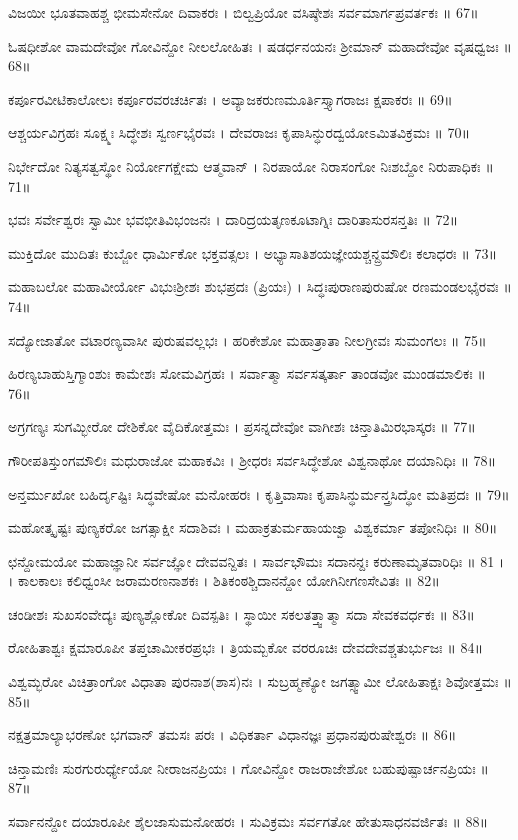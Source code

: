 ವಿಜಯೀ ಭೂತವಾಹಶ್ಚ ಭೀಮಸೇನೋ ದಿವಾಕರಃ ।
ಬಿಲ್ವಪ್ರಿಯೋ ವಸಿಷ್ಠೇಶಃ ಸರ್ವಮಾರ್ಗಪ್ರವರ್ತಕಃ ॥ 67॥

ಓಷಧೀಶೋ ವಾಮದೇವೋ ಗೋವಿನ್ದೋ ನೀಲಲೋಹಿತಃ ।
ಷಡರ್ಧನಯನಃ ಶ್ರೀಮಾನ್ ಮಹಾದೇವೋ ವೃಷಧ್ವಜಃ ॥ 68॥

ಕರ್ಪೂರವೀಟಿಕಾಲೋಲಃ ಕರ್ಪೂರವರಚರ್ಚಿತಃ ।
ಅವ್ಯಾಜಕರುಣಮೂರ್ತಿಸ್ತ್ಯಾಗರಾಜಃ ಕ್ಷಪಾಕರಃ ॥ 69॥

ಆಶ್ಚರ್ಯವಿಗ್ರಹಃ ಸೂಕ್ಷ್ಮಃ ಸಿದ್ಧೇಶಃ ಸ್ವರ್ಣಭೈರವಃ ।
ದೇವರಾಜಃ ಕೃಪಾಸಿನ್ಧುರದ್ವಯೋಽಮಿತವಿಕ್ರಮಃ ॥ 70॥

ನಿರ್ಭೇದೋ ನಿತ್ಯಸತ್ವಸ್ಥೋ ನಿರ್ಯೋಗಕ್ಷೇಮ ಆತ್ಮವಾನ್ ।
ನಿರಪಾಯೋ ನಿರಾಸಂಗೋ ನಿಃಶಬ್ದೋ ನಿರುಪಾಧಿಕಃ ॥ 71॥

ಭವಃ ಸರ್ವೇಶ್ವರಃ ಸ್ವಾಮೀ ಭವಭೀತಿವಿಭಂಜನಃ ।
ದಾರಿದ್ರಯತೃಣಕೂಟಾಗ್ನಿಃ ದಾರಿತಾಸುರಸನ್ತತಿಃ ॥ 72॥

ಮುಕ್ತಿದೋ ಮುದಿತಃ ಕುಬ್ಜೋ ಧಾರ್ಮಿಕೋ ಭಕ್ತವತ್ಸಲಃ ।
ಅಭ್ಯಾಸಾತಿಶಯಜ್ಞೇಯಶ್ಚನ್ದ್ರಮೌಲಿಃ ಕಲಾಧರಃ ॥ 73॥

ಮಹಾಬಲೋ ಮಹಾವೀರ್ಯೋ ವಿಭುಃಶ್ರೀಶಃ ಶುಭಪ್ರದಃ (ಪ್ರಿಯಃ) ।
ಸಿದ್ಧಃಪುರಾಣಪುರುಷೋ ರಣಮಂಡಲಭೈರವಃ ॥ 74॥

ಸದ್ಯೋಜಾತೋ ವಟಾರಣ್ಯವಾಸೀ ಪುರುಷವಲ್ಲಭಃ ।
ಹರಿಕೇಶೋ ಮಹಾತ್ರಾತಾ ನೀಲಗ್ರೀವಃ ಸುಮಂಗಲಃ ॥ 75॥

ಹಿರಣ್ಯಬಾಹುಸ್ತಿಗ್ಮಾಂಶುಃ ಕಾಮೇಶಃ ಸೋಮವಿಗ್ರಹಃ ।
ಸರ್ವಾತ್ಮಾ ಸರ್ವಸತ್ಕರ್ತಾ ತಾಂಡವೋ ಮುಂಡಮಾಲಿಕಃ ॥ 76॥

ಅಗ್ರಗಣ್ಯಃ ಸುಗಮ್ಭೀರೋ ದೇಶಿಕೋ ವೈದಿಕೋತ್ತಮಃ ।
ಪ್ರಸನ್ನದೇವೋ ವಾಗೀಶಃ ಚಿನ್ತಾತಿಮಿರಭಾಸ್ಕರಃ ॥ 77॥

ಗೌರೀಪತಿಸ್ತುಂಗಮೌಲಿಃ ಮಧುರಾಜೋ ಮಹಾಕವಿಃ ।
ಶ್ರೀಧರಃ ಸರ್ವಸಿದ್ಧೇಶೋ ವಿಶ್ವನಾಥೋ ದಯಾನಿಧಿಃ ॥ 78॥

ಅನ್ತರ್ಮುಖೋ ಬಹಿರ್ದೃಷ್ಟಿಃ ಸಿದ್ಧವೇಷೋ ಮನೋಹರಃ ।
ಕೃತ್ತಿವಾಸಾಃ ಕೃಪಾಸಿನ್ಧುರ್ಮನ್ತ್ರಸಿದ್ಧೋ ಮತಿಪ್ರದಃ ॥ 79॥

ಮಹೋತ್ಕೃಷ್ಟಃ ಪುಣ್ಯಕರೋ ಜಗತ್ಸಾಕ್ಷೀ ಸದಾಶಿವಃ ।
ಮಹಾಕ್ರತುರ್ಮಹಾಯಜ್ವಾ ವಿಶ್ವಕರ್ಮಾ ತಪೋನಿಧಿಃ ॥ 80॥

ಛನ್ದೋಮಯೋ ಮಹಾಜ್ಞಾನೀ ಸರ್ವಜ್ಞೋ ದೇವವನ್ದಿತಃ ।
ಸಾರ್ವಭೌಮಃ ಸದಾನನ್ದಃ ಕರುಣಾಮೃತವಾರಿಧಿಃ ॥ 81 । ।
ಕಾಲಕಾಲಃ ಕಲಿಧ್ವಂಸೀ ಜರಾಮರಣನಾಶಕಃ ।
ಶಿತಿಕಂಠಶ್ಚಿದಾನನ್ದೋ ಯೋಗಿನೀಗಣಸೇವಿತಃ ॥ 82॥

ಚಂಡೀಶಃ ಸುಖಸಂವೇದ್ಯಃ ಪುಣ್ಯಶ್ಲೋಕೋ ದಿವಸ್ಪತಿಃ ।
ಸ್ಥಾಯೀ ಸಕಲತತ್ತ್ವಾತ್ಮಾ ಸದಾ ಸೇವಕವರ್ಧಕಃ ॥ 83॥

ರೋಹಿತಾಶ್ವಃ ಕ್ಷಮಾರೂಪೀ ತಪ್ತಚಾಮೀಕರಪ್ರಭಃ ।
ತ್ರಿಯಮ್ಬಕೋ ವರರೂಚಿಃ ದೇವದೇವಶ್ಚತುರ್ಭುಜಃ ॥ 84॥

ವಿಶ್ವಮ್ಭರೋ ವಿಚಿತ್ರಾಂಗೋ ವಿಧಾತಾ ಪುರನಾಶ(ಶಾಸ)ನಃ ।
ಸುಬ್ರಹ್ಮಣ್ಯೋ ಜಗತ್ಸ್ವಾಮೀ ಲೋಹಿತಾಕ್ಷಃ ಶಿವೋತ್ತಮಃ ॥ 85॥

ನಕ್ಷತ್ರಮಾಲ್ಯಾಭರಣೋ ಭಗವಾನ್ ತಮಸಃ ಪರಃ ।
ವಿಧಿಕರ್ತಾ ವಿಧಾನಜ್ಞಃ ಪ್ರಧಾನಪುರುಷೇಶ್ವರಃ ॥ 86॥

ಚಿನ್ತಾಮಣಿಃ ಸುರಗುರುರ್ಧ್ಯೇಯೋ ನೀರಾಜನಪ್ರಿಯಃ ।
ಗೋವಿನ್ದೋ ರಾಜರಾಜೇಶೋ ಬಹುಪುಷ್ಪಾರ್ಚನಪ್ರಿಯಃ ॥ 87॥

ಸರ್ವಾನನ್ದೋ ದಯಾರೂಪೀ ಶೈಲಜಾಸುಮನೋಹರಃ ।
ಸುವಿಕ್ರಮಃ ಸರ್ವಗತೋ ಹೇತುಸಾಧನವರ್ಜಿತಃ ॥ 88॥

